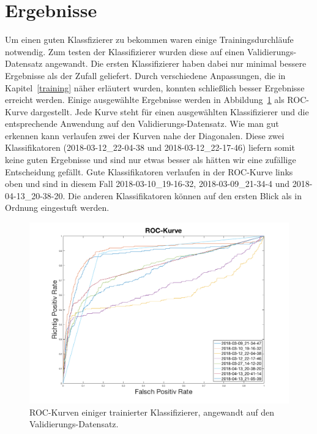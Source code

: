 \section{Ergebnisse}

Um einen guten Klassfizierer zu bekommen waren einige Trainingsdurchläufe notwendig. Zum testen der Klassifizierer wurden diese auf einen Validierungs-Datensatz angewandt. Die ersten Klassifizierer haben dabei nur minimal bessere Ergebnisse als der Zufall geliefert. Durch verschiedene Anpassungen, die in Kapitel~\ref{training} näher erläutert wurden, konnten schließlich besser Ergebnisse erreicht werden. Einige ausgewählte Ergebnisse werden in Abbildung~\ref{fig:roc} als ROC-Kurve dargestellt. Jede Kurve steht für einen ausgewählten Klassifizierer und die entsprechende Anwendung auf den Validierungs-Datensatz. Wie man gut erkennen kann verlaufen zwei der Kurven nahe der Diagonalen. Diese zwei Klassifikatoren (2018-03-12\_22-04-38 und 2018-03-12\_22-17-46) liefern somit keine guten Ergebnisse und sind nur etwas besser als hätten wir eine zufällige Entscheidung gefällt. Gute Klassifikatoren verlaufen in der ROC-Kurve links oben und sind in diesem Fall 2018-03-10\_19-16-32, 2018-03-09\_21-34-4 und 2018-04-13\_20-38-20. Die anderen Klassifikatoren können auf den ersten Blick als in Ordnung eingestuft werden.

\begin{figure}[htb!]
	\begin{center}
		\includegraphics[width=\textwidth]{./pics/evaluation/roc_analysis.png}
		\caption{ROC-Kurven einiger trainierter Klassifizierer, angewandt auf den Validierungs-Datensatz.}
		\label{fig:roc}
    \end{center}
\end{figure}

